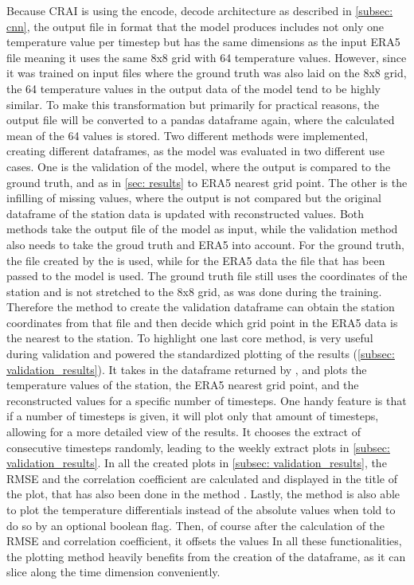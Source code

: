 Because CRAI is using the encode, decode architecture as described in \autoref{subsec: cnn}, the output file in  format that the model produces includes not only one temperature value per timestep but has the same dimensions as the input ERA5 file meaning it uses the same 8x8 grid with 64 temperature values.
However, since it was trained on input files where the ground truth was also laid on the 8x8 grid, the 64 temperature values in the output data of the model tend to be highly similar.
To make this transformation but primarily for practical reasons, the output file will be converted to a pandas dataframe again, where the calculated mean of the 64 values is stored.
Two different methods were implemented, creating different dataframes, as the model was evaluated in two different use cases.
One is the validation of the model, where the output is compared to the ground truth, and as in \autoref{sec: results} to ERA5 nearest grid point.
The other is the infilling of missing values, where the output is not compared but the original dataframe of the station data is updated with reconstructed values.
Both methods take the output file of the model as input, while the validation method also needs to take the groud truth and ERA5 into account.
For the ground truth, the file created by the  is used, while for the ERA5 data the file that has been passed to the model is used.
The ground truth file still uses the coordinates of the station and is not stretched to the 8x8 grid, as was done during the training.
Therefore the method to create the validation dataframe  can obtain the station coordinates from that file and then decide which grid point in the ERA5 data is the nearest to the station.
To highlight one last core method,  is very useful during validation and powered the standardized plotting of the results (\autoref{subsec: validation_results}).
It takes in the dataframe returned by , and plots the temperature values of the station, the ERA5 nearest grid point, and the reconstructed values for a specific number of timesteps.
One handy feature is that if a number of timesteps is given, it will plot only that amount of timesteps, allowing for a more detailed view of the results.
It chooses the extract of  consecutive timesteps randomly, leading to the weekly extract plots in \autoref{subsec: validation_results}.
In all the created plots in \autoref{subsec: validation_results}, the RMSE and the correlation coefficient are calculated and displayed in the title of the plot,
that has also been done in the method .
Lastly, the method is also able to plot the temperature differentials instead of the absolute values when told to do so by an optional boolean flag.
Then, of course after the calculation of the RMSE and correlation coefficient, it offsets the values
In all these functionalities, the plotting method heavily benefits from the creation of the dataframe, as it can slice along the time dimension conveniently.